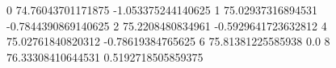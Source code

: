0 74.76043701171875 -1.053375244140625
1 75.02937316894531 -0.7844390869140625
2 75.2208480834961 -0.5929641723632812
4 75.02761840820312 -0.78619384765625
6 75.81381225585938 0.0
8 76.33308410644531 0.5192718505859375
